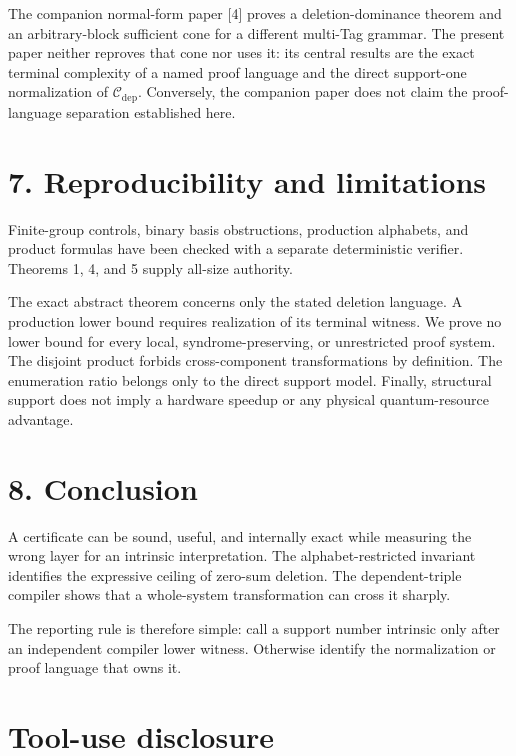 \documentclass[
  11pt,
]{article}
\begin{document}
The companion normal-form paper {[}4{]} proves a deletion-dominance
theorem and an arbitrary-block sufficient cone for a different multi-Tag
grammar. The present paper neither reproves that cone nor uses it: its
central results are the exact terminal complexity of a named proof
language and the direct support-one normalization of
\(\mathcal C_{\mathrm{dep}}\). Conversely, the companion paper does not
claim the proof-language separation established here.

\hypertarget{reproducibility-and-limitations}{%
\section{7. Reproducibility and
limitations}\label{reproducibility-and-limitations}}

Finite-group controls, binary basis obstructions, production alphabets,
and product formulas have been checked with a separate deterministic
verifier. Theorems 1, 4, and 5 supply all-size authority.

The exact abstract theorem concerns only the stated deletion language. A
production lower bound requires realization of its terminal witness. We
prove no lower bound for every local, syndrome-preserving, or
unrestricted proof system. The disjoint product forbids cross-component
transformations by definition. The enumeration ratio belongs only to the
direct support model. Finally, structural support does not imply a
hardware speedup or any physical quantum-resource advantage.

\hypertarget{conclusion}{%
\section{8. Conclusion}\label{conclusion}}

A certificate can be sound, useful, and internally exact while measuring
the wrong layer for an intrinsic interpretation. The alphabet-restricted
invariant identifies the expressive ceiling of zero-sum deletion. The
dependent-triple compiler shows that a whole-system transformation can
cross it sharply.

The reporting rule is therefore simple: call a support number intrinsic
only after an independent compiler lower witness. Otherwise identify the
normalization or proof language that owns it.

\hypertarget{tool-use-disclosure}{%
\section{Tool-use disclosure}\label{tool-use-disclosure}}
\end{document}
